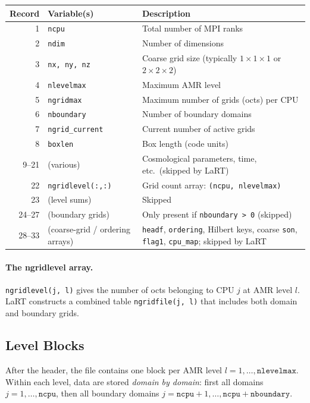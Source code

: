 \documentclass[english,a4paper]{my_memo}
\begin{document}
\begin{center}
\begin{tabular}{r l p{8.5cm}}
\toprule
Record & Variable(s) & Description \\
\midrule
1  & \texttt{ncpu}          & Total number of MPI ranks \\
2  & \texttt{ndim}          & Number of dimensions \\
3  & \texttt{nx, ny, nz}    & Coarse grid size (typically $1\times1\times1$ or $2\times2\times2$) \\
4  & \texttt{nlevelmax}     & Maximum AMR level \\
5  & \texttt{ngridmax}      & Maximum number of grids (octs) per CPU \\
6  & \texttt{nboundary}     & Number of boundary domains \\
7  & \texttt{ngrid\_current}& Current number of active grids \\
8  & \texttt{boxlen}        & Box length (code units) \\
9--21 & (various)           & Cosmological parameters, time, etc.\ (skipped by LaRT)\\
22 & \texttt{ngridlevel(:,:)} & Grid count array: \texttt{(ncpu, nlevelmax)} \\
23 & (level sums)           & Skipped \\
24--27 & (boundary grids)   & Only present if \texttt{nboundary > 0} (skipped) \\
28--33 & (coarse-grid / ordering arrays)  & \texttt{headf}, \texttt{ordering}, Hilbert keys, coarse \texttt{son}, \texttt{flag1}, \texttt{cpu\_map}; skipped by LaRT \\
\bottomrule
\end{tabular}
\end{center}

\paragraph{The ngridlevel array.}
\texttt{ngridlevel(j, l)} gives the number of octs belonging to CPU $j$
at AMR level $l$.  LaRT constructs a combined table
\texttt{ngridfile(j, l)} that includes both domain and boundary grids.

\subsection{Level Blocks}

After the header, the file contains one block per AMR level
$l = 1, \ldots, \texttt{nlevelmax}$.  Within each level, data are stored
\emph{domain by domain}: first all domains $j = 1, \ldots, \texttt{ncpu}$,
then all boundary domains $j = \texttt{ncpu}+1, \ldots,
\texttt{ncpu}+\texttt{nboundary}$.
\end{document}
